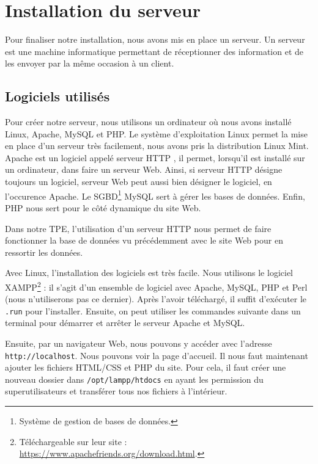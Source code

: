 \chapter{Installation du serveur}
\label{chapitre:serveur}

Pour finaliser notre installation, nous avons mis en place un serveur. Un serveur est une machine informatique permettant de réceptionner des information et de les envoyer par la même occasion à un client.

\section{Logiciels utilisés}
\label{section:logiciels}

Pour créer notre serveur, nous utilisons un ordinateur où nous avons installé Linux, Apache, MySQL et PHP. Le système d'exploitation Linux permet la mise en place d'un serveur très facilement, nous avons pris la distribution Linux Mint. Apache est un logiciel appelé \og serveur HTTP \fg, il permet, lorsqu'il est installé sur un ordinateur, dans faire un serveur Web. Ainsi, si \og serveur HTTP \fg{} désigne toujours un logiciel, \og serveur Web \fg{} peut aussi bien désigner le logiciel, en l'occurence Apache. Le SGBD\footnote{Système de gestion de bases de données.} MySQL sert à gérer les bases de données. Enfin, PHP nous sert pour le côté dynamique du site Web.

Dans notre TPE, l'utilisation d'un serveur HTTP nous permet de faire fonctionner la base de données vu précédemment avec le site Web pour en ressortir les données.

\Espace

Avec Linux, l'installation des logiciels est très facile. Nous utilisons le logiciel XAMPP\footnote{Téléchargeable sur leur site : \url{https://www.apachefriends.org/download.html}.} : il s'agit d'un ensemble de logiciel avec Apache, MySQL, PHP et Perl (nous n'utiliserons pas ce dernier). Après l'avoir téléchargé, il suffit d'exécuter le \verb-.run- pour l'installer. Ensuite, on peut utiliser les commandes suivante dans un terminal pour démarrer et arrêter le serveur Apache et MySQL.


Ensuite, par un navigateur Web, nous pouvons y accéder avec l'adresse \verb-http://localhost-. Nous pouvons voir la page d'accueil. Il nous faut maintenant ajouter les fichiers HTML/CSS et PHP du site. Pour cela, il faut créer une nouveau dossier dans \verb-/opt/lampp/htdocs- en ayant les permission du superutilisateurs et transférer tous nos fichiers à l'intérieur.

